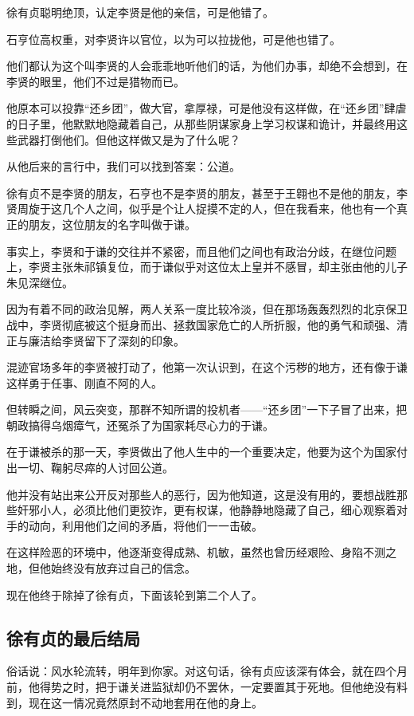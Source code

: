 \begin{multicols}{\theparacolNo}
徐有贞聪明绝顶，认定李贤是他的亲信，可是他错了。

石亨位高权重，对李贤许以官位，以为可以拉拢他，可是他也错了。

他们都认为这个叫李贤的人会乖乖地听他们的话，为他们办事，却绝不会想到，在李贤的眼里，他们不过是猎物而已。

他原本可以投靠“还乡团”，做大官，拿厚禄，可是他没有这样做，在“还乡团”肆虐的日子里，他默默地隐藏着自己，从那些阴谋家身上学习权谋和诡计，并最终用这些武器打倒他们。但他这样做又是为了什么呢？

从他后来的言行中，我们可以找到答案：公道。

徐有贞不是李贤的朋友，石亨也不是李贤的朋友，甚至于王翱也不是他的朋友，李贤周旋于这几个人之间，似乎是个让人捉摸不定的人，但在我看来，他也有一个真正的朋友，这位朋友的名字叫做于谦。

事实上，李贤和于谦的交往并不紧密，而且他们之间也有政治分歧，在继位问题上，李贤主张朱祁镇复位，而于谦似乎对这位太上皇并不感冒，却主张由他的儿子朱见深继位。

因为有着不同的政治见解，两人关系一度比较冷淡，但在那场轰轰烈烈的北京保卫战中，李贤彻底被这个挺身而出、拯救国家危亡的人所折服，他的勇气和顽强、清正与廉洁给李贤留下了深刻的印象。

混迹官场多年的李贤被打动了，他第一次认识到，在这个污秽的地方，还有像于谦这样勇于任事、刚直不阿的人。

但转瞬之间，风云突变，那群不知所谓的投机者——“还乡团”一下子冒了出来，把朝政搞得乌烟瘴气，还冤杀了为国家耗尽心力的于谦。

在于谦被杀的那一天，李贤做出了他人生中的一个重要决定，他要为这个为国家付出一切、鞠躬尽瘁的人讨回公道。

他并没有站出来公开反对那些人的恶行，因为他知道，这是没有用的，要想战胜那些奸邪小人，必须比他们更狡诈，更有权谋，他静静地隐藏了自己，细心观察着对手的动向，利用他们之间的矛盾，将他们一一击破。

在这样险恶的环境中，他逐渐变得成熟、机敏，虽然也曾历经艰险、身陷不测之地，但他始终没有放弃过自己的信念。

现在他终于除掉了徐有贞，下面该轮到第二个人了。

\subsection{徐有贞的最后结局}
俗话说：风水轮流转，明年到你家。对这句话，徐有贞应该深有体会，就在四个月前，他得势之时，把于谦关进监狱却仍不罢休，一定要置其于死地。但他绝没有料到，现在这一情况竟然原封不动地套用在他的身上。


\end{multicols}
